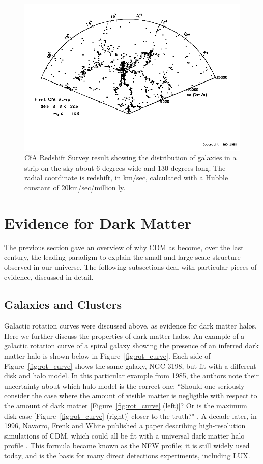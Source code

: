 \begin{figure}[htbp]
\begin{center}
\includegraphics[width=\textwidth]{figures/theory/cfa.png}
\caption{CfA Redshift Survey result showing the distribution of galaxies in a strip on the sky about 6 degrees wide and 130 degrees long. The radial coordinate is redshift, in km/sec, calculated with a Hubble constant of 20km/sec/million ly.}
\label{fig:cfa}
\end{center}
\end{figure}


\section{Evidence for Dark Matter}
The previous section gave an overview of why \ac{CDM} as become, over the last century, the leading paradigm to explain the small and large-scale structure observed in our universe. The following subsections deal with particular pieces of evidence, discussed in detail.

\subsection{Galaxies and Clusters}
Galactic rotation curves were discussed above, as evidence for dark matter halos. Here we further discuss the properties of dark matter halos. An example of a galactic rotation curve of a spiral galaxy showing the presence of an inferred dark matter halo is shown below in Figure~\ref{fig:rot_curve}. Each side of  Figure~\ref{fig:rot_curve} shows the same galaxy, NGC 3198, but fit with a different disk and halo model.  In this particular example from 1985, the authors note their uncertainty about which halo model is the correct one: ``Should one seriously consider the case where the amount of visible matter is negligible with respect to the amount of dark matter [Figure~\ref{fig:rot_curve} (left)]? Or is the maximum disk case [Figure~\ref{fig:rot_curve} (right)] closer to the truth?" \cite{Albada1985}. A decade later, in 1996, Navarro, Frenk and White published a paper describing high-resolution simulations of \ac{CDM}, which could all be fit with a universal dark matter halo profile \cite{Navarro1996}. This formula became known as the \ac{NFW} profile; it is still widely used today, and is the basis for many direct detections experiments, including \ac{LUX}. 

